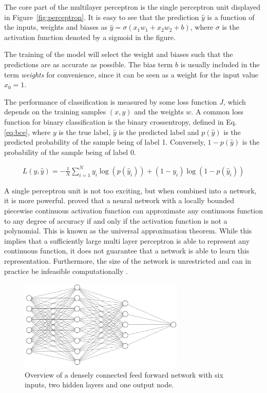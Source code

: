 The core part of the multilayer perceptron is the single perceptron unit displayed in Figure~\ref{fig:perceptron}. It is easy to see that the prediction $\hat{y}$ is a function of the inputs, weights and biases as $\hat{y} = \sigma(x_1 w_1 + x_2 w_2 + b)$, where $\sigma$ is the activation function denoted by a sigmoid in the figure. 

The training of the model will select the weight and biases such that the predictions are as accurate as possible. The bias term $b$ is usually included in the term \textit{weights} for convenience, since it can be seen as a weight for the input value $x_0 = 1$. 

The performance of classification is measured by some loss function $J$, which depends on the training samples $(x,y)$ and the weights $w$.  A common loss function for binary classification is the binary crossentropy, defined in Eq. \ref{eq:bce}, where $y$ is the true label, $\hat{y}$ is the predicted label and $p(\hat{y})$ is the predicted probability of the sample being of label 1. Conversely, $1 - p(\hat{y})$ is the probability of the sample being of label 0. 

\begin{align}
    L(y,\hat{y}) = -\frac{1}{N} \sum_{i=1}^N y_i \log{(p(\hat{y}_i))} + (1 - y_i) \log{(1 - p(\hat{y}_i))} \label{eq:bce}
\end{align}

A single perceptron unit is not too exciting, but when combined into a network, it is more powerful. \citet{leshno1993multilayer} proved that a neural network with a locally bounded piecewise continuous activation function can approximate any continuous function to any degree of accuracy if and only if the activation function is not a polynomial. This is known as the universal approximation theorem. While this implies that a sufficiently large multi layer perceptron is able to represent any continuous function, it does not guarantee that a network is able to learn this representation. Furthermore, the size of the network is unrestricted and can in practice be infeasible computationally \citep{Goodfellow-et-al-2016}. 


\begin{figure}[t]
    \centering
    \includegraphics[width=0.7\textwidth]{Figures/ff.PNG}
    \caption{Overview of a densely connected feed forward network with six inputs, two hidden layers and one output node.}
    \label{fig:mlp}
\end{figure}

